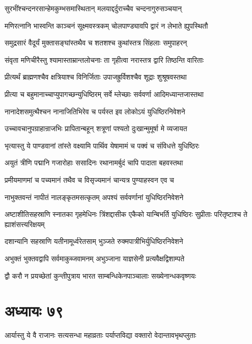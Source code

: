 \twolineshloka
{सुरभींश्चन्दनरसान्हेमकुम्भसमास्थितान्}
{मलयाद्दर्दुराच्चैव चन्दनागुरुसञ्चयान्}


\twolineshloka
{मणिरत्नानि भास्वन्ति काञ्चनं सूक्ष्मवस्त्रकम्}
{चोलपाण्ड्यावपि द्वारं न लेभाते ह्युपस्थितौ}


\twolineshloka
{समुद्रसारं वैदूर्यं मुक्तासङ्घांस्तथैव च}
{शतशश्च कुथांस्तत्र सिंहलाः समुपाहरन्}


\twolineshloka
{संवृता मणिचीरैस्तु श्यामास्ताम्रान्तलोचनाः}
{ता गृहीत्वा नरास्तत्र द्वारि तिष्ठन्ति वारिताः}


\twolineshloka
{प्रीत्यर्थं ब्राह्मणश्चैव क्षत्रियाश्च विनिर्जिताः}
{उपाजह्रुर्विशश्चैव शूद्राः शुश्रूषवस्तथा}


\twolineshloka
{प्रीत्या च बहुमानाच्चाप्युपागच्छन्युधिष्ठिरम्}
{सर्वे म्लेच्छाः सर्ववर्णा आदिमध्यान्तजास्तथा}


\twolineshloka
{नानादेशसमुत्थैश्चन नानाजितिभिरेव च}
{पर्यस्त इव लोकोऽयं युधिष्ठिरनिवेशने}


\twolineshloka
{उच्चावचानुपग्राहान्राजभिः प्रापितान्बहून्}
{शत्रूणां पश्यतो दुःखान्मुमूर्षा मे व्यजायत}


\twolineshloka
{भृत्यास्तु ये पाण्डवानां तांस्ते वक्ष्यामि पार्थिव}
{येषामामं च पक्वं च संविधत्ते युधिष्ठिरः}


\twolineshloka
{अयुतं त्रीणि पद्मानि गजारोहाः ससादिनः}
{रथानामर्बुदं चापि पादाता बहवस्तथा}


\twolineshloka
{प्रमीयमाणमां च पच्यमानं तथैव च}
{विसृज्यमानं चान्यत्र पुण्याहस्वन एव च}


\twolineshloka
{नाभुक्तवन्तं नापीतं नालङ्कृतमसत्कृतम्}
{अपश्यं सर्ववर्णानां युधिष्ठिरनिवेशने}


\threelineshloka
{अष्टाशीतिसहस्राणि स्नातका गृहमेधिनः}
{त्रिंशद्दासीक एकैको यान्बिभर्ति युधिष्ठिरः}
{सुप्रीताः परितृष्टाश्च ते ह्याशंसत्त्यरिक्षयम्}


\twolineshloka
{दशान्यानि सहस्राणि यतीनामूर्ध्वरेतसाम्}
{भुञ्जते रुक्मपात्रीभिर्युधिष्ठिरनिवेशने}


\twolineshloka
{अभुक्तं भुक्तवद्वापि सर्वमाकुब्जवामनम्}
{अभुञ्जाना याज्ञसेनी प्रत्यवैक्षद्विशाम्पते}


\twolineshloka
{द्वौ करौ न प्रयच्छेतां कुन्तीपुत्राय भारत}
{साम्बन्धिकेनपाञ्चालाः सख्येनान्धकवृष्णयः}


\chapter{अध्यायः ७९}
\twolineshloka
{आर्यास्तु ये वै राजानः सत्यसन्धा महाव्रताः}
{पर्याप्तविद्या वक्तारो वेदान्तावभृथप्लुताः}


